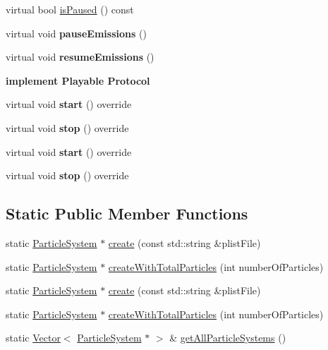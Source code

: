 \begin{DoxyCompactItemize}
virtual bool \hyperlink{classParticleSystem_a5a829fd9224d4dbaa29ed79d6a1d5f29}{is\+Paused} () const
\item 
\mbox{\label{classParticleSystem_a32f0f66738e4277950203fd8fe6a39f3}} 
virtual void {\bfseries pause\+Emissions} ()
\item 
\mbox{\label{classParticleSystem_aa6a9235eafea30030f9c957b0e1753f7}} 
virtual void {\bfseries resume\+Emissions} ()
\end{DoxyCompactItemize}
\begin{Indent}\textbf{ implement Playable Protocol}\par
\begin{DoxyCompactItemize}
\item 
\mbox{\label{classParticleSystem_a94b6197f0d182b3a77c9442b4497a322}} 
virtual void {\bfseries start} () override
\item 
\mbox{\label{classParticleSystem_ac924d8556d1b69e34645d529b6493df3}} 
virtual void {\bfseries stop} () override
\item 
\mbox{\label{classParticleSystem_a8ddbed6df1eaeb86fc4198dea98c4fb9}} 
virtual void {\bfseries start} () override
\item 
\mbox{\label{classParticleSystem_ab6d00237798f09e65824255530c2ee5e}} 
virtual void {\bfseries stop} () override
\end{DoxyCompactItemize}
\end{Indent}
\subsection*{Static Public Member Functions}
\begin{DoxyCompactItemize}
\item 
static \hyperlink{classParticleSystem}{Particle\+System} $\ast$ \hyperlink{classParticleSystem_a1def1ff715871730db5ed752bc17a2d5}{create} (const std\+::string \&plist\+File)
\item 
static \hyperlink{classParticleSystem}{Particle\+System} $\ast$ \hyperlink{classParticleSystem_a591e13344da2d2d0f10ffc6fc86b8fca}{create\+With\+Total\+Particles} (int number\+Of\+Particles)
\item 
static \hyperlink{classParticleSystem}{Particle\+System} $\ast$ \hyperlink{classParticleSystem_ad3fc419c2bbc1246d537a318291efc63}{create} (const std\+::string \&plist\+File)
\item 
static \hyperlink{classParticleSystem}{Particle\+System} $\ast$ \hyperlink{classParticleSystem_a668f8c6d2565694be34420236e76b30d}{create\+With\+Total\+Particles} (int number\+Of\+Particles)
\item 
static \hyperlink{classVector}{Vector}$<$ \hyperlink{classParticleSystem}{Particle\+System} $\ast$ $>$ \& \hyperlink{classParticleSystem_a35d125accbf0d470adf1c51b5628e583}{get\+All\+Particle\+Systems} ()
\end{DoxyCompactItemize}
